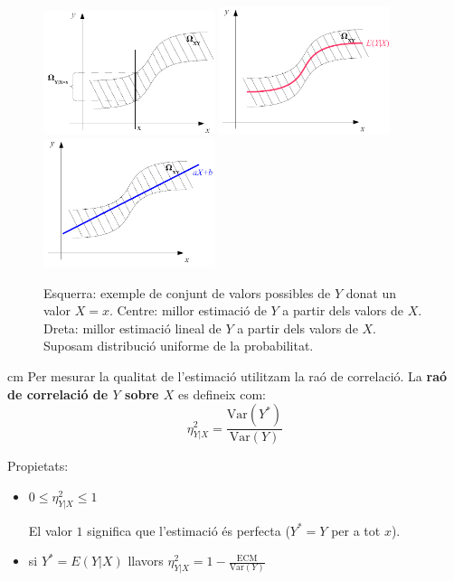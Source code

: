 \documentclass{article}
\begin{document}
\begin{figure}[htbp]
\includegraphics[width=5cm]{estejem.png} \qquad 
\includegraphics[width=5cm]{estesp.png} \qquad 
\includegraphics[width=5cm]{estlin.png}
\caption{Esquerra: exemple de conjunt de valors possibles de $Y$ donat un valor $X=x$. Centre: millor estimaci\'o de $Y$
a partir dels valors de $X$. Dreta:  millor estimaci\'o lineal de $Y$ a partir dels valors de $X$.
Suposam distribuci\'o uniforme de la probabilitat.}
\end{figure}
 
 cm
\noindent
Per mesurar la qualitat de l'estimaci\'o utilitzam
la ra\'o de correlaci\'o. La \textbf{ra\'o de correlaci\'o de $Y$ sobre $X$} es defineix com:
\[
\eta_{Y|X}^2=\frac{\mathrm{Var}(Y^*)}{\mathrm{Var}(Y)}
\]

\noindent
Propietats: 
\begin{itemize}
\item $0 \leq \eta_{Y|X}^2 \leq 1$

El valor $1$ significa que l'estimaci\'o \'es perfecta ($Y^* = Y$ per a tot $x$).

\item si $Y^* = E(Y|X)$ llavors $\eta_{Y|X}^2=1-\frac{\mathrm{ECM}}{\mathrm{Var}(Y)}$
\end{itemize}
\end{document}
